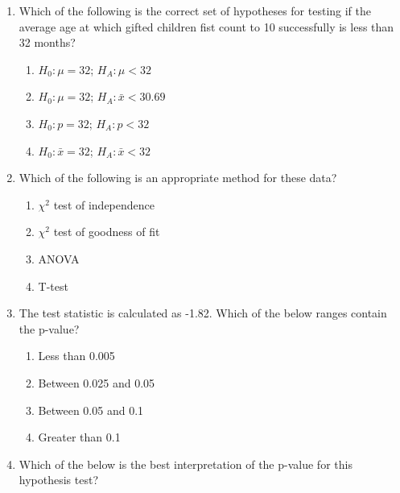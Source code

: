 \documentclass[11pt]{article}
\newcommand{\solnMult}[1]{ #1 }
\begin{document}
\begin{enumerate}
\item \label{countF} Which of the following is the correct set of hypotheses for testing if the average age at 
which gifted children fist count to 10 successfully is less than 32 months?

\begin{multicols}{2}
\begin{enumerate}
\item \solnMult{$H_0: \mu = 32$; $H_A: \mu < 32$}
\item $H_0: \mu = 32$; $H_A: \bar{x} < 30.69$
\item $H_0: p = 32$; $H_A: p < 32$
\item $H_0: \bar{x} = 32$; $H_A: \bar{x} < 32$
\end{enumerate}
\end{multicols}

\item Which of the following is an appropriate method for these data?

\begin{multicols}{2}
\begin{enumerate}
\item $\chi^2$ test of independence
\item $\chi^2$ test of goodness of fit
\item ANOVA
\item \solnMult{T-test}
\end{enumerate}
\end{multicols}

\item The test statistic is calculated as -1.82. Which of the below ranges contain the p-value?

\begin{multicols}{2}
\begin{enumerate}
\item Less than 0.005
\item \solnMult{Between 0.025 and 0.05}
\item Between 0.05 and 0.1
\item Greater than 0.1
\end{enumerate}
\end{multicols}

\item  \label{countL} Which of the below is the best interpretation of the p-value for this hypothesis test?


\end{enumerate}
\end{document}
